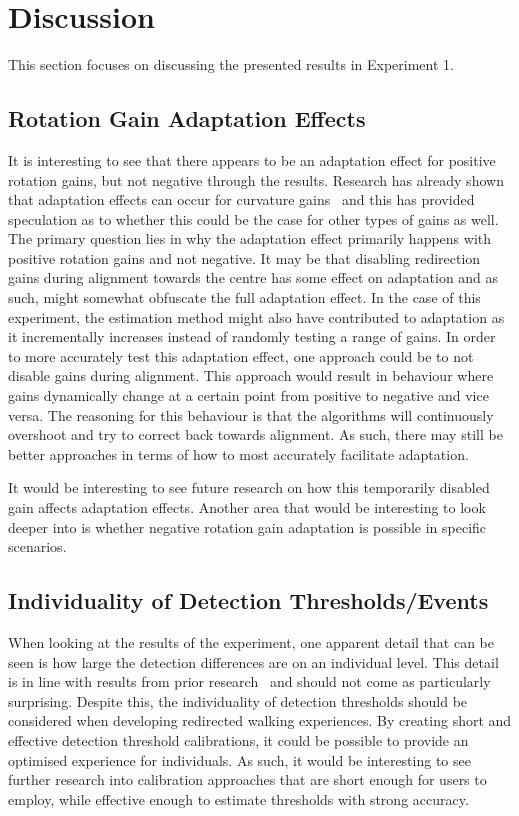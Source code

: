 \section{Discussion}
This section focuses on discussing the presented results in Experiment 1.

\subsection{Rotation Gain Adaptation Effects}
It is interesting to see that there appears to be an adaptation effect for positive rotation gains, but not negative through the results. Research has already shown that adaptation effects can occur for curvature gains~\cite{bolling2019shrinking} and this has provided speculation as to whether this could be the case for other types of gains as well. The primary question lies in why the adaptation effect primarily happens with positive rotation gains and not negative. It may be that disabling redirection gains during alignment towards the centre has some effect on adaptation and as such, might somewhat obfuscate the full adaptation effect. In the case of this experiment, the estimation method might also have contributed to adaptation as it incrementally increases instead of randomly testing a range of gains. In order to more accurately test this adaptation effect, one approach could be to not disable gains during alignment. This approach would result in behaviour where gains dynamically change at a certain point from positive to negative and vice versa. The reasoning for this behaviour is that the algorithms will continuously overshoot and try to correct back towards alignment. As such, there may still be better approaches in terms of how to most accurately facilitate adaptation. 

It would be interesting to see future research on how this temporarily disabled gain affects adaptation effects. Another area that would be interesting to look deeper into is whether negative rotation gain adaptation is possible in specific scenarios. 

\subsection{Individuality of Detection Thresholds/Events}
When looking at the results of the experiment, one apparent detail that can be seen is how large the detection differences are on an individual level. This detail is in line with results from prior research~\cite{8446225, nguyen2018individual, schmitz2018you, fuglestad2018redirected} and should not come as particularly surprising. Despite this, the individuality of detection thresholds should be considered when developing redirected walking experiences. By creating short and effective detection threshold calibrations, it could be possible to provide an optimised experience for individuals. As such, it would be interesting to see further research into calibration approaches that are short enough for users to employ, while effective enough to estimate thresholds with strong accuracy. 

